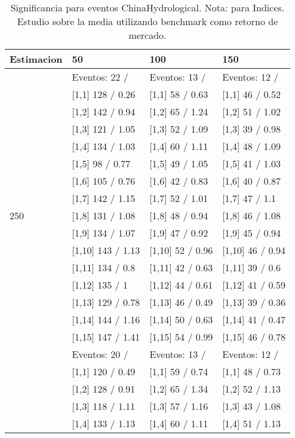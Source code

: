 \begin{table}

\caption{Significancia para eventos ChinaHydrological. Nota: para Indices. Estudio sobre la media utilizando benchmark como retorno de mercado.}
\centering
\begin{tabular}[t]{llll}
\toprule
Estimacion & 50 & 100 & 150\\
\midrule
 & Eventos:  22 / & Eventos:  13 / & Eventos:  12 /\\
 & {}[1,1] 128  / 0.26 & {}[1,1] 58  / 0.63 & {}[1,1] 46  / 0.52\\
 & {}[1,2] 142  / 0.94 & {}[1,2] 65  / 1.24 & {}[1,2] 51  / 1.02\\
 & {}[1,3] 121  / 1.05 & {}[1,3] 52  / 1.09 & {}[1,3] 39  / 0.98\\
 & {}[1,4] 134  / 1.03 & {}[1,4] 60  / 1.11 & {}[1,4] 48  / 1.09\\
\addlinespace
 & {}[1,5] 98  / 0.77 & {}[1,5] 49  / 1.05 & {}[1,5] 41  / 1.03\\
 & {}[1,6] 105  / 0.76 & {}[1,6] 42  / 0.83 & {}[1,6] 40  / 0.87\\
 & {}[1,7] 142  / 1.15 & {}[1,7] 52  / 1.01 & {}[1,7] 47  / 1.1\\
250 & {}[1,8] 131  / 1.08 & {}[1,8] 48  / 0.94 & {}[1,8] 46  / 1.08\\
 & {}[1,9] 134  / 1.07 & {}[1,9] 47  / 0.92 & {}[1,9] 45  / 0.94\\
\addlinespace
 & {}[1,10] 143  / 1.13 & {}[1,10] 52  / 0.96 & {}[1,10] 46  / 0.94\\
 & {}[1,11] 134  / 0.8 & {}[1,11] 42  / 0.63 & {}[1,11] 39  / 0.6\\
 & {}[1,12] 135  / 1 & {}[1,12] 44  / 0.61 & {}[1,12] 41  / 0.59\\
 & {}[1,13] 129  / 0.78 & {}[1,13] 46  / 0.49 & {}[1,13] 39  / 0.36\\
 & {}[1,14] 144  / 1.16 & {}[1,14] 50  / 0.63 & {}[1,14] 41  / 0.47\\
\addlinespace
 & {}[1,15] 147  / 1.41 & {}[1,15] 54  / 0.99 & {}[1,15] 46  / 0.78\\
 & Eventos:  20 / & Eventos:  13 / & Eventos:  12 /\\
 & {}[1,1] 120  / 0.49 & {}[1,1] 59  / 0.74 & {}[1,1] 48  / 0.73\\
 & {}[1,2] 128  / 0.91 & {}[1,2] 65  / 1.34 & {}[1,2] 52  / 1.13\\
 & {}[1,3] 118  / 1.11 & {}[1,3] 57  / 1.16 & {}[1,3] 43  / 1.08\\
\addlinespace
 & {}[1,4] 133  / 1.13 & {}[1,4] 60  / 1.11 & {}[1,4] 51  / 1.13\\

\end{tabular}
\end{table}
